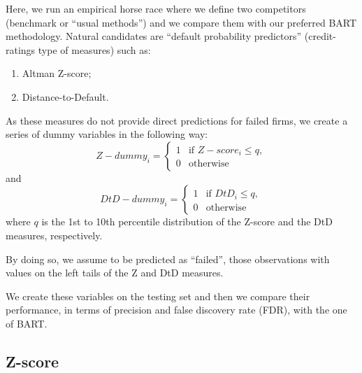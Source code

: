 \documentclass[]{article}
\newenvironment{Shaded}{\begin{snugshade}}{\end{snugshade}}
\newcommand{\KeywordTok}[1]{\textcolor[rgb]{0.13,0.29,0.53}{\textbf{#1}}}
\newcommand{\NormalTok}[1]{#1}
\newcommand{\OperatorTok}[1]{\textcolor[rgb]{0.81,0.36,0.00}{\textbf{#1}}}
\newcommand{\StringTok}[1]{\textcolor[rgb]{0.31,0.60,0.02}{#1}}
\begin{document}
Here, we run an empirical horse race where we define two competitors
(benchmark or ``usual methods'') and we compare them with our preferred
BART methodology. Natural candidates are ``default probability
predictors'' (credit-ratings type of measures) such as:

\begin{enumerate}
\item  Altman Z-score;
\item  Distance-to-Default.
\end{enumerate}

As these measures do not provide direct predictions for failed firms, we
create a series of dummy variables in the following way:
\begin{equation}
        Z-dummy_i=\begin{cases}
        1 &  \text{if $Z-score_i \leq q$}, \nonumber \\
        0 &   \text{otherwise}
        \end{cases}
\end{equation} and \begin{equation}
        DtD-dummy_i=\begin{cases}
        1 &  \text{if $DtD_i \leq q$}, \nonumber \\
        0 &   \text{otherwise}
        \end{cases}
\end{equation} where \(q\) is the 1st to 10th percentile distribution of
the Z-score and the DtD measures, respectively.

By doing so, we assume to be predicted as ``failed'', those observations
with values on the left tails of the Z and DtD measures.

We create these variables on the testing set and then we compare their
performance, in terms of precision and false discovery rate (FDR), with
the one of BART.

\hypertarget{z-score}{%
\subsection{Z-score}\label{z-score}}

\begin{Shaded}
\end{Shaded}
\end{document}
